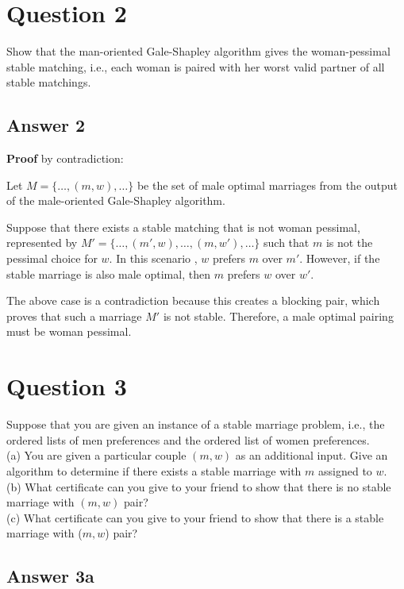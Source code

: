 \documentclass[twoside]{article}
\begin{document}
\section{Question 2}
Show that the man-oriented Gale-Shapley algorithm gives the woman-pessimal stable matching, i.e., each woman is paired with her worst valid partner of all stable matchings. 

\subsection{Answer 2}

\textbf{Proof} by contradiction:

Let $M = \{ \ldots, (m, w), \ldots \}$ be the set of male optimal marriages from the output of the male-oriented Gale-Shapley algorithm. 

Suppose that there exists a stable matching that is not woman pessimal, represented by $M' = \{ \ldots, (m', w), \ldots, (m, w'), \ldots\}$ such that $m$ is not the pessimal choice for $w$. In this scenario , $w$ prefers $m$ over $m'$. However, if the stable marriage is also male optimal, then $m$ prefers $w$ over $w'$. 

The above case is a contradiction because this creates a blocking pair, which proves that such a marriage $M'$ is not stable. Therefore, a male optimal pairing must be woman pessimal.


\section{Question 3}
Suppose that you are given an instance of a stable marriage problem, i.e., the ordered lists of men preferences and the ordered list of women preferences.\\

(a) You are given a particular couple $(m, w)$ as an additional input. Give an algorithm to determine if there exists a stable marriage with $m$ assigned to $w$.\\
(b) What certificate can you give to your friend to show that there is no stable marriage with $(m, w)$ pair?\\
(c) What certificate can you give to your friend to show that there is a stable marriage with ($m, w$) pair?

\subsection{Answer 3a}
\end{document}
